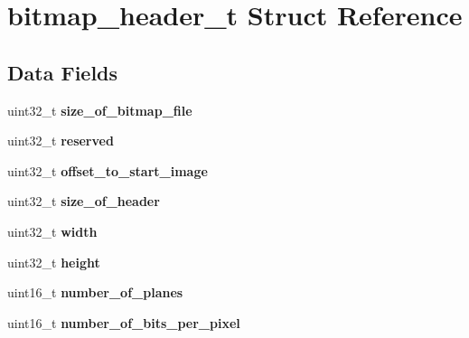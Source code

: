 \hypertarget{structbitmap__header__t}{\section{bitmap\+\_\+header\+\_\+t Struct Reference}
\label{structbitmap__header__t}
}
\subsection*{Data Fields}
\begin{DoxyCompactItemize}
\item 
\hypertarget{structbitmap__header__t_a3102fde4dff5a09123f4ef0c78daf0b2}{uint32\+\_\+t {\bfseries size\+\_\+of\+\_\+bitmap\+\_\+file}}\label{structbitmap__header__t_a3102fde4dff5a09123f4ef0c78daf0b2}

\item 
\hypertarget{structbitmap__header__t_a09381d970679628715804297e8a5e460}{uint32\+\_\+t {\bfseries reserved}}\label{structbitmap__header__t_a09381d970679628715804297e8a5e460}

\item 
\hypertarget{structbitmap__header__t_a4ee6e6320d329ecfbb8aa3ef2fbdec49}{uint32\+\_\+t {\bfseries offset\+\_\+to\+\_\+start\+\_\+image}}\label{structbitmap__header__t_a4ee6e6320d329ecfbb8aa3ef2fbdec49}

\item 
\hypertarget{structbitmap__header__t_a1a6b90cb5e371a9ecddab02ef82552be}{uint32\+\_\+t {\bfseries size\+\_\+of\+\_\+header}}\label{structbitmap__header__t_a1a6b90cb5e371a9ecddab02ef82552be}

\item 
\hypertarget{structbitmap__header__t_a90b79e2695d807b6f96973d90797daa5}{uint32\+\_\+t {\bfseries width}}\label{structbitmap__header__t_a90b79e2695d807b6f96973d90797daa5}

\item 
\hypertarget{structbitmap__header__t_ab4047d16b6219610fa8f0fc4ece3bb5b}{uint32\+\_\+t {\bfseries height}}\label{structbitmap__header__t_ab4047d16b6219610fa8f0fc4ece3bb5b}

\item 
\hypertarget{structbitmap__header__t_abdcd2b92c90f4ed494f0eddfa19f6c01}{uint16\+\_\+t {\bfseries number\+\_\+of\+\_\+planes}}\label{structbitmap__header__t_abdcd2b92c90f4ed494f0eddfa19f6c01}

\item 
\hypertarget{structbitmap__header__t_a713e7323875fba050fb6d67c6fc735cd}{uint16\+\_\+t {\bfseries number\+\_\+of\+\_\+bits\+\_\+per\+\_\+pixel}}\label{structbitmap__header__t_a713e7323875fba050fb6d67c6fc735cd}


\end{DoxyCompactItemize}
